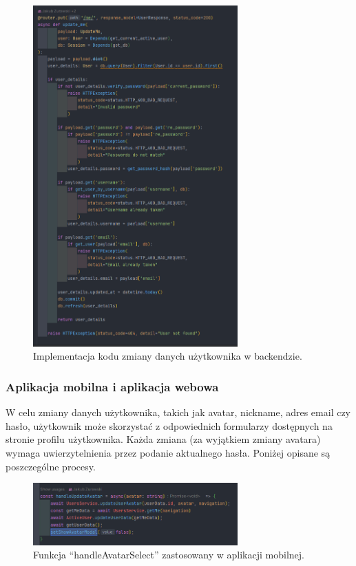 \begin{figure}[H]
    \centering
    \includegraphics[width=0.7\textwidth]{chapters/chapter_8/screens/edit_user_backend_2}
    \caption{Implementacja kodu zmiany danych użytkownika w backendzie.}
    \label{img:edit_user_backend_2}
\end{figure}

\subsubsection{Aplikacja mobilna i aplikacja webowa}
W celu zmiany danych użytkownika, takich jak avatar, nickname, adres email czy hasło, użytkownik może skorzystać z odpowiednich formularzy dostępnych na stronie profilu użytkownika. Każda zmiana (za wyjątkiem zmiany avatara) wymaga uwierzytelnienia przez podanie aktualnego hasła. Poniżej opisane są poszczególne procesy.

\begin{figure}[H]
    \centering
    \includegraphics[width=0.7\textwidth]{chapters/chapter_8/screens/edit_user_mobile}
    \caption{Funkcja “handleAvatarSelect” zastosowany w aplikacji mobilnej.}
    \label{img:edit_user_mobile}
\end{figure}

